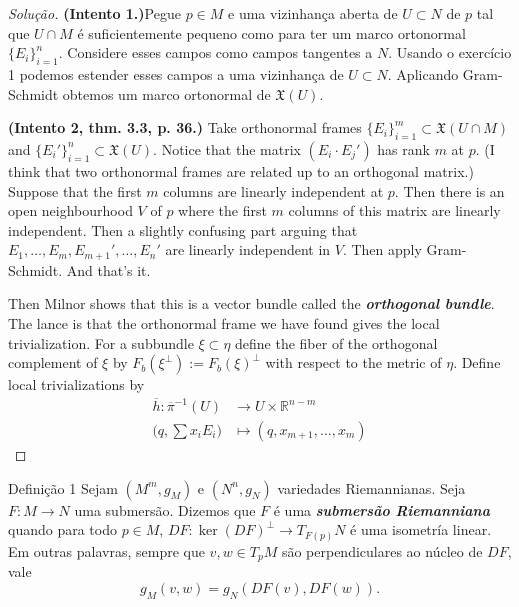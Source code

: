 \begin{proof}[Solução]\leavevmode
\textbf{(Intento 1.)}Pegue \(p \in M\) e uma vizinhança aberta de \(U \subset N\) de \(p\) tal que \(U \cap M\) é suficientemente pequeno como para ter um marco ortonormal \(\{E_i\}_{i=1}^n\). Considere esses campos como campos tangentes a \(N\). Usando o exercício 1 podemos estender esses campos a uma vizinhança de \(U \subset N\). Aplicando Gram-Schmidt obtemos um marco ortonormal de  \(\mathfrak{X}(U)\).

\textbf{(Intento 2, \cite{mc} thm. 3.3, p. 36.)} Take orthonormal frames  \(\{E_i\}_{i=1}^m\subset\mathfrak{X}(U \cap M)\) and \(\{E_i'\}_{i=1}^n \subset \mathfrak{X}(U)\). Notice that the matrix \((E_i\cdot E_j')\) has rank \(m\) at \(p\). (I think that two orthonormal frames are related up to an orthogonal matrix.) Suppose that the first \(m\) columns are linearly independent at \(p\). Then there is an open neighbourhood \(V\) of \(p\) where the first \(m\) columns of this matrix are linearly independent. Then a slightly confusing part arguing that \(E_1,\ldots,E_m,E_{m+1}',\ldots,E_{n}'\) are linearly independent in \(V\). Then apply Gram-Schmidt. And that's it.

Then Milnor shows that this is a vector bundle called the \textit{\textbf{orthogonal bundle}}. The lance is that the orthonormal frame we have found gives the local trivialization. For a subbundle \(\xi \subset \eta\) define the fiber of the orthogonal complement of \(\xi\) by \(F_b(\xi^\perp):=F_b(\xi)^\perp\) with respect to the metric of \(\eta\). Define local trivializations by
\begin{align*}
	\overline{h}: \overline{\pi}^{-1}(U) &\longrightarrow U\times \mathbb{R}^{n-m} \\
	 \Big(q,\sum x_iE_i\Big)&\longmapsto (q,x_{m+1},\ldots,x_m)
\end{align*}

\end{proof}

\begin{thing4}{Definição 1}\label{def:1}\leavevmode
Sejam \((M^m,g_M)\) e \((N^n,g_N)\) variedades Riemannianas. Seja \(F:M \to N\) uma submersão. Dizemos que \(F\) é uma \textit{\textbf{submersão Riemanniana}} quando para todo \(p \in M\), \(DF: \ker (DF)^\perp\to T_{F(p)}N\) é uma isometría linear. Em outras palavras, sempre que \(v, w \in T_pM\) são perpendiculares ao núcleo de \(DF\), vale
\[g_M(v,w)=g_N(DF(v),DF(w)).\]
\end{thing4}

